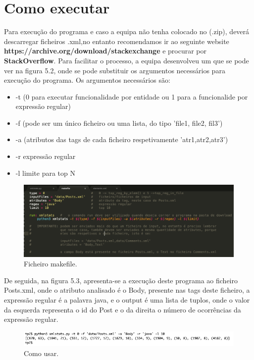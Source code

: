 \documentclass[11pt,a4paper]{report}%
\begin{document}
\section{Como executar}
Para execução do programa e caso a equipa não tenha colocado no (.zip), deverá descarregar ficheiros .xml,no entanto recomendamos ir ao seguinte website \textbf{https://archive.org/download/stackexchange} e procurar por \textbf{StackOverflow}. Para facilitar o processo, a equipa desenvolveu um  que se pode ver na figura 5.2, onde se pode substituir os argumentos necessários para execução do programa. Os argumentos necessários são:
\begin{itemize}
    \item -t (0 para executar funcionalidade por entidade ou 1 para a funcionalide por expressão regular)
    \item -f (pode ser um único ficheiro ou uma lista, do tipo 'file1, file2, fil3')
    \item -a  (atributos das tags de cada ficheiro respetivamente 'atr1,atr2,atr3')
    \item -r expressão regular
    \item -l limite para top N
\end{itemize}{}
\begin{figure}[h]
	\centering
	\includegraphics[scale=0.45]{makefile.png}
	\caption{Ficheiro makefile.}
	\label{img:pag}
\end{figure}

De seguida, na figura 5.3, apresenta-se a execução deste programa ao ficheiro Posts.xml, onde o atributo analisado é o Body, presente nas tags deste ficheiro, a expressão regular é a palavra java, e o output é uma lista de tuplos, onde o valor da esquerda representa o id do Post e o da direita o número de ocorrências da expressão regular.

\begin{figure}[h]
	\centering
	\includegraphics[scale=0.65]{use.png}
	\caption{Como usar.}
	\label{img:pag}
\end{figure}
\end{document}
